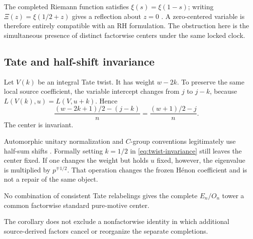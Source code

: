 \begin{remark}
The completed Riemann function satisfies
\(\xi(s)=\xi(1-s)\); writing \(\Xi(z)=\xi(1/2+z)\) gives a reflection
about \(z=0\) \cite[§§25.4 and 25.10]{DLMF}.  A zero-centered variable is
therefore entirely compatible with an RH formulation.  The obstruction
here is the simultaneous presence of distinct factorwise centers under the
same locked clock.
\end{remark}

\subsection{Tate and half-shift invariance}

Let \(V(k)\) be an integral Tate twist.  It has weight \(w-2k\).  To
preserve the same local source coefficient, the variable intercept changes
from \(j\) to \(j-k\), because
\(L(V(k),u)=L(V,u+k)\).  Hence
\begin{equation}\label{eq:twist-invariance}
 \frac{(w-2k+1)/2-(j-k)}n
 =\frac{(w+1)/2-j}{n}.
\end{equation}
The center is invariant.

Automorphic unitary normalization and \(C\)-group conventions legitimately
use half-sum shifts \cite{BuzzardGee2010,SST2014}.  Formally setting
\(k=1/2\) in \eqref{eq:twist-invariance} still leaves the center fixed.
If one changes the weight but holds \(u\) fixed, however, the eigenvalue is
multiplied by \(p^{\mp1/2}\).  That operation changes the frozen H\'enon
coefficient and is not a repair of the same object.

\begin{corollary}\label{cor:center-no-go}
No combination of consistent Tate relabelings gives the complete
\(E_n/O_n\) tower a common factorwise standard pure-motive center.
\end{corollary}

The corollary does not exclude a nonfactorwise identity in which additional
source-derived factors cancel or reorganize the separate completions.
